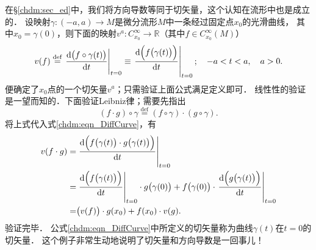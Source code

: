 在\S\ref{chdm:sec_ed}中，我们将方向导数等同于切矢量，这个认知在流形中也是成立的．
设映射$\gamma:(-a,a)\to M$是微分流形$M$中一条经过固定点$x_0$的光滑曲线，
其中$x_0=\gamma(0)$，则下面的映射$v^a:C^\infty_{x_0}\to \mathbb{R}$（其中$f\in C_{x_0}^\infty(M)$）
\begin{equation}\label{chdm:eqn_DiffCurve}
    v(f)\overset{\mathrm {def}}{=} \left. \frac{{\rm d} \bigl(f \circ \gamma (t)\bigr)}{{\rm d} t} \right |_{t=0}
    \equiv \left. \frac{{\rm d} \Bigl(f \bigl(\gamma (t)\bigr)\Bigr)}{{\rm d} t} \right |_{t=0};
    \quad -a < t < a, \quad a>0.
\end{equation}
便确定了$x_0$点的一个切矢量$v^a$；只需验证上面公式满足定义即可．
线性性的验证是一望而知的．下面验证Leibniz律；需要先指出
\begin{equation}\label{chdm:eqn_f-cdot-g-circo-gamma}
    (f\cdot g)\circ \gamma \overset{\mathrm {def}}{=} (f\circ \gamma) \cdot (g\circ \gamma)  .
\end{equation}
将上式代入式\eqref{chdm:eqn_DiffCurve}，有
\begin{align*}
    v(f\cdot g)=& \left. \frac{{\rm d} \Bigl(f \bigl(\gamma (t)\bigr)\cdot 
        g \bigl(\gamma (t)\bigr)\Bigr)}{{\rm d} t} \right |_{t=0} \\
    =& \left. \frac{{\rm d} \Bigl(f \bigl(\gamma (t)\bigr)
        \Bigr)}{{\rm d} t} \right |_{t=0} \cdot g \bigl(\gamma (0)\bigr) +
      f \bigl(\gamma (0)\bigr)\cdot \left. \frac{{\rm d} \Bigl( 
        g \bigl(\gamma (t)\bigr)\Bigr)}{{\rm d} t} \right |_{t=0} \\
    =& \bigl(v(f)\bigr)\cdot g(x_0)+ f(x_0)\cdot v (g) .
\end{align*}
验证完毕．
公式\eqref{chdm:eqn_DiffCurve}中所定义的切矢量称为曲线$\gamma(t)$在$t=0$的{\heiti 切矢量}．
这个例子非常生动地说明了切矢量和方向导数是一回事儿！

